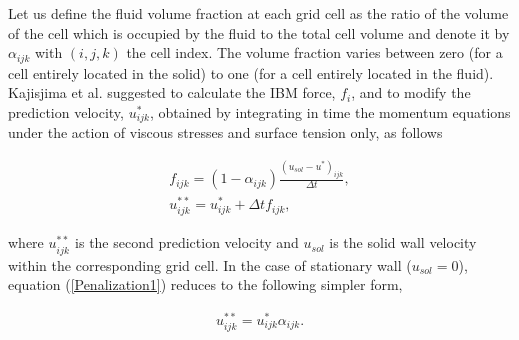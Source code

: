 \documentclass[review]{elsarticle}
\begin{document}
Let us define the fluid volume fraction at each grid cell as the ratio of the volume of the cell which is occupied by the fluid to the total cell volume and denote it  by $\alpha_{ijk}$ with $(i,j,k)$ the cell index. The volume fraction varies between zero (for a cell entirely located in the solid) to one (for a cell entirely located in the fluid). Kajisjima et al. suggested to calculate the IBM force, $f_i$, and to modify the prediction velocity, $u_{ijk}^*$, obtained by integrating in time the momentum equations under the action of viscous stresses and surface tension only, as follows
\begin{linenomath}\begin{equation} \label{Penalization1}
\begin{gathered}
f_{ijk} = (1-\alpha_{ijk}) \frac{{\left(u_{sol}-u^*\right)}_{ijk}}{\Delta t},\\
u_{ijk}^{**} =  u_{ijk}^{*} + \Delta t f_{ijk},
 \end{gathered}
\end{equation}\end{linenomath}
 where $u_{ijk}^{**}$ is the second prediction velocity and $u_{sol}$ is the solid wall velocity within the corresponding grid cell. In the case of stationary wall ($u_{sol}=0$), equation (\ref{Penalization1}) reduces to the following simpler form,
\begin{linenomath}\begin{equation} \label{Penalization2}
\begin{gathered}
u_{ijk}^{**} =  u_{ijk}^{*}  \alpha_{ijk}.
 \end{gathered}
\end{equation}\end{linenomath}

\end{document}
